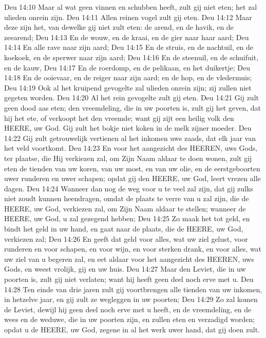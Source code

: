 Deu 14:10  Maar al wat geen vinnen en schubben heeft, zult gij niet eten; het zal ulieden onrein zijn.
Deu 14:11  Allen reinen vogel zult gij eten.
Deu 14:12  Maar deze zijn het, van dewelke gij niet zult eten: de arend, en de havik, en de zeearend;
Deu 14:13  En de wouw, en de kraai, en de gier naar haar aard;
Deu 14:14  En alle rave naar zijn aard;
Deu 14:15  En de struis, en de nachtuil, en de koekoek, en de sperwer naar zijn aard;
Deu 14:16  En de steenuil, en de schuifuit, en de kauw,
Deu 14:17  En de roerdomp, en de pelikaan, en het duikertje;
Deu 14:18  En de ooievaar, en de reiger naar zijn aard; en de hop, en de vledermuis;
Deu 14:19  Ook al het kruipend gevogelte zal ulieden onrein zijn; zij zullen niet gegeten worden.
Deu 14:20  Al het rein gevogelte zult gij eten.
Deu 14:21  Gij zult geen dood aas eten; den vreemdeling, die in uw poorten is, zult gij het geven, dat hij het ete, of verkoopt het den vreemde; want gij zijt een heilig volk den HEERE, uw God. Gij zult het bokje niet koken in de melk zijner moeder.
Deu 14:22  Gij zult getrouwelijk vertienen al het inkomen uws zaads, dat elk jaar van het veld voortkomt.
Deu 14:23  En voor het aangezicht des HEEREN, uws Gods, ter plaatse, die Hij verkiezen zal, om Zijn Naam aldaar te doen wonen, zult gij eten de tienden van uw koren, van uw most, en van uw olie, en de eerstgeboorten uwer runderen en uwer schapen; opdat gij den HEERE, uw God, leert vrezen alle dagen.
Deu 14:24  Wanneer dan nog de weg voor u te veel zal zijn, dat gij zulks niet zoudt kunnen heendragen, omdat de plaats te verre van u zal zijn, die de HEERE, uw God, verkiezen zal, om Zijn Naam aldaar te stellen; wanneer de HEERE, uw God, u zal gezegend hebben;
Deu 14:25  Zo maak het tot geld, en bindt het geld in uw hand, en gaat naar de plaats, die de HEERE, uw God, verkiezen zal;
Deu 14:26  En geeft dat geld voor alles, wat uw ziel gelust, voor runderen en voor schapen, en voor wijn, en voor sterken drank, en voor alles, wat uw ziel van u begeren zal, en eet aldaar voor het aangezicht des HEEREN, uws Gods, en weest vrolijk, gij en uw huis.
Deu 14:27  Maar den Leviet, die in uw poorten is, zult gij niet verlaten; want hij heeft geen deel noch erve met u.
Deu 14:28  Ten einde van drie jaren zult gij voortbrengen alle tienden van uw inkomen, in hetzelve jaar, en gij zult ze wegleggen in uw poorten;
Deu 14:29  Zo zal komen de Leviet, dewijl hij geen deel noch erve met u heeft, en de vreemdeling, en de wees en de weduwe, die in uw poorten zijn, en zullen eten en verzadigd worden; opdat u de HEERE, uw God, zegene in al het werk uwer hand, dat gij doen zult.
